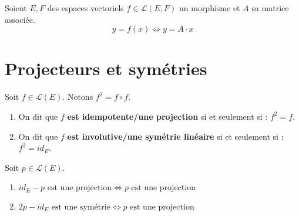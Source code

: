 \begin{proposition}
    Soient $E, F$ des espaces vectoriels $f \in \mathcal{L}(E, F)$ un morphisme et $A$ sa matrice associée. 
    \[ y = f(x) \iff y = A \cdot x \]
\end{proposition}

\section{Projecteurs et symétries}
\begin{definition}
    Soit $f \in \mathcal{L}(E)$. Notons $f^2 = f \circ f$.
    \begin{enumerate}
        \item On dit que $f$ \textbf{est idempotente/une projection} si et seulement si : $f^2 = f$.
        \item On dit que $f$ \textbf{est involutive/une symétrie linéaire} si et seulement si : $f^2 = id_E$.
    \end{enumerate}
\end{definition}

\begin{proposition} 
    Soit $p \in \mathcal{L}(E)$.
    \begin{enumerate}
        \item $id_E - p \text{ est une projection} \iff p \text{ est une projection}$
        \item $2p - id_E \text{ est une symétrie} \iff p \text{ est une projection}$
    \end{enumerate}
\end{proposition}

